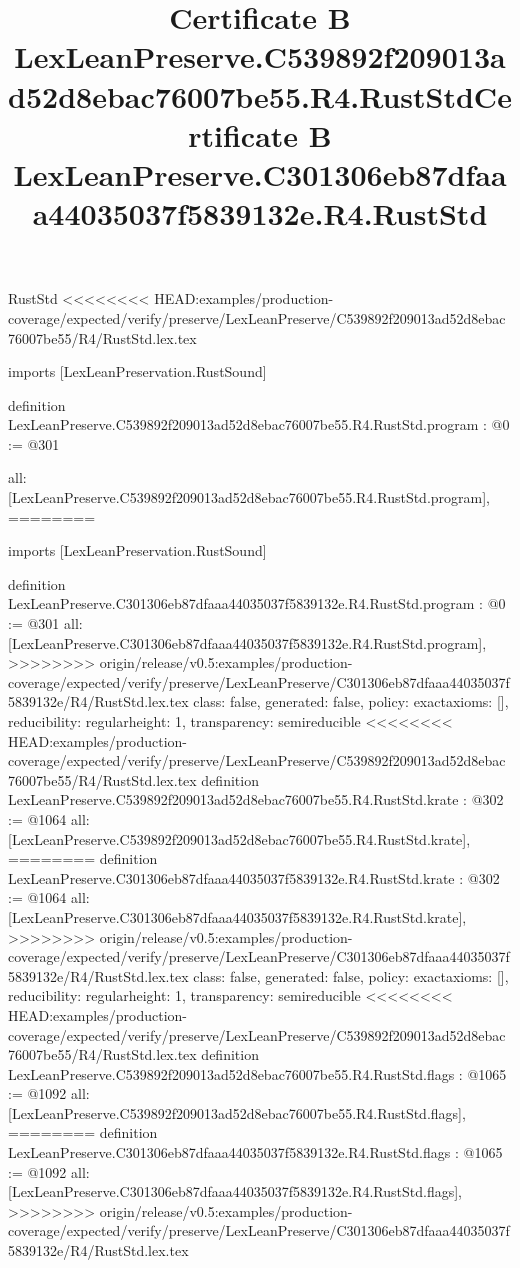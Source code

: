 \begin{lexlean}{RustStd}
<<<<<<<< HEAD:examples/production-coverage/expected/verify/preserve/LexLeanPreserve/C539892f209013ad52d8ebac76007be55/R4/RustStd.lex.tex
\title{Certificate B LexLeanPreserve.C539892f209013ad52d8ebac76007be55.R4.RustStd}
\begin{coremodule}
imports [LexLeanPreservation.RustSound]

definition LexLeanPreserve.C539892f209013ad52d8ebac76007be55.R4.RustStd.program : @0 := @301 {
  all: [LexLeanPreserve.C539892f209013ad52d8ebac76007be55.R4.RustStd.program],
========
\title{Certificate B LexLeanPreserve.C301306eb87dfaaa44035037f5839132e.R4.RustStd}
\begin{coremodule}
imports [LexLeanPreservation.RustSound]

definition LexLeanPreserve.C301306eb87dfaaa44035037f5839132e.R4.RustStd.program : @0 := @301 {
  all: [LexLeanPreserve.C301306eb87dfaaa44035037f5839132e.R4.RustStd.program],
>>>>>>>> origin/release/v0.5:examples/production-coverage/expected/verify/preserve/LexLeanPreserve/C301306eb87dfaaa44035037f5839132e/R4/RustStd.lex.tex
  class: false,
  generated: false,
  policy: exact{axioms: []},
  reducibility: regular{height: 1},
  transparency: semireducible
}
<<<<<<<< HEAD:examples/production-coverage/expected/verify/preserve/LexLeanPreserve/C539892f209013ad52d8ebac76007be55/R4/RustStd.lex.tex
definition LexLeanPreserve.C539892f209013ad52d8ebac76007be55.R4.RustStd.krate : @302 := @1064 {
  all: [LexLeanPreserve.C539892f209013ad52d8ebac76007be55.R4.RustStd.krate],
========
definition LexLeanPreserve.C301306eb87dfaaa44035037f5839132e.R4.RustStd.krate : @302 := @1064 {
  all: [LexLeanPreserve.C301306eb87dfaaa44035037f5839132e.R4.RustStd.krate],
>>>>>>>> origin/release/v0.5:examples/production-coverage/expected/verify/preserve/LexLeanPreserve/C301306eb87dfaaa44035037f5839132e/R4/RustStd.lex.tex
  class: false,
  generated: false,
  policy: exact{axioms: []},
  reducibility: regular{height: 1},
  transparency: semireducible
}
<<<<<<<< HEAD:examples/production-coverage/expected/verify/preserve/LexLeanPreserve/C539892f209013ad52d8ebac76007be55/R4/RustStd.lex.tex
definition LexLeanPreserve.C539892f209013ad52d8ebac76007be55.R4.RustStd.flags : @1065 := @1092 {
  all: [LexLeanPreserve.C539892f209013ad52d8ebac76007be55.R4.RustStd.flags],
========
definition LexLeanPreserve.C301306eb87dfaaa44035037f5839132e.R4.RustStd.flags : @1065 := @1092 {
  all: [LexLeanPreserve.C301306eb87dfaaa44035037f5839132e.R4.RustStd.flags],
>>>>>>>> origin/release/v0.5:examples/production-coverage/expected/verify/preserve/LexLeanPreserve/C301306eb87dfaaa44035037f5839132e/R4/RustStd.lex.tex
}}}
\end{coremodule}}
\end{coremodule}
\end{lexlean}

